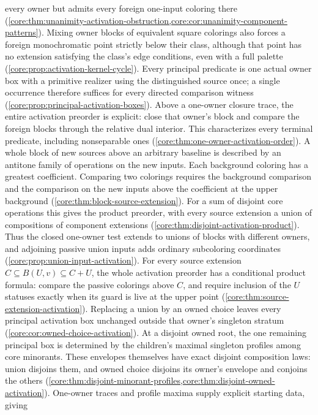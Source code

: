 every owner but admits every foreign one-input coloring there
(\cref{core:thm:unanimity-activation-obstruction,core:cor:unanimity-component-patterns}).
Mixing owner blocks of equivalent square colorings also forces a
foreign monochromatic point strictly below their class, although that
point has no extension satisfying the class's edge conditions, even
with a full palette
(\cref{core:prop:activation-kernel-cycle}).
Every principal predicate is one actual owner box with a primitive
realizer using the distinguished source once; a single occurrence
therefore suffices for every directed comparison witness
(\cref{core:prop:principal-activation-boxes}). Above a one-owner closure
trace, the entire activation preorder is explicit: close that owner's
block and compare the foreign blocks through the relative dual interior.
This characterizes every terminal predicate, including nonseparable ones
(\cref{core:thm:one-owner-activation-order}). A whole block of new
sources above an arbitrary baseline is described by an antitone family
of operations on the new inputs. Each background coloring has a greatest
coefficient. Comparing two colorings requires the background comparison
and the comparison on the new inputs above the coefficient at the
upper background (\cref{core:thm:block-source-extension}). For a sum
of disjoint core operations this gives the product preorder, with every
source extension a union of compositions of component extensions
(\cref{core:thm:disjoint-activation-product}).
Thus the closed one-owner test extends to unions of blocks with different
owners, and adjoining passive union inputs adds ordinary subcoloring
coordinates (\cref{core:prop:union-input-activation}).
For every source extension $C\subseteq B(U,v)\subseteq C+U$, the
whole activation preorder has a conditional product formula: compare
the passive colorings above $C$, and require inclusion of the $U$
statuses exactly when its guard is live at the upper point
(\cref{core:thm:source-extension-activation}).
Replacing a union by an owned choice leaves every principal activation
box unchanged outside that owner's singleton stratum
(\cref{core:cor:owned-choice-activation}). At a disjoint owned root,
the one remaining principal box is determined by the children's maximal
singleton profiles among core minorants. These envelopes themselves have
exact disjoint composition laws: union disjoins them, and owned choice
disjoins its owner's envelope and conjoins the others
(\cref{core:thm:disjoint-minorant-profiles,core:thm:disjoint-owned-activation}).
One-owner traces and profile maxima supply explicit starting data, giving
